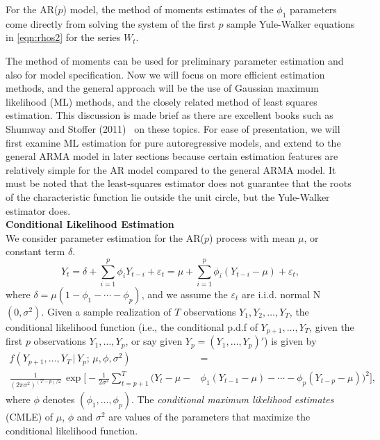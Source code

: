 \begin{ex}[AR($p$) Model]
 For the AR($p$) model, the method of moments estimates of the $\phi_1$ parameters come directly from solving the system of the first $p$ sample Yule-Walker equations in \eqref{eqn:rhos2} for the series $W_t$. \xqed
\end{ex}


The method of moments can be used for preliminary parameter estimation and also for model specification. Now we will focus on more efficient estimation methods, and the general approach will be the use of Gaussian maximum likelihood (ML) methods, and the closely related method of least squares estimation. This discussion is made brief as there are excellent books such as Shumway and Stoffer (2011)~\cite{shumway2011arima} on these topics. For ease of presentation, we will first examine ML estimation for pure autoregressive models, and extend to the general ARMA model in later sections because certain estimation features are relatively simple for the AR model compared to the general ARMA model. It must be noted that the least-squares estimator does not guarantee that the roots of the characteristic function lie outside the unit circle, but the Yule-Walker estimator does. \\


\noindent\textbf{Conditional Likelihood Estimation} \\


We consider parameter estimation for the AR($p$) process with mean $\mu$, or constant term $\delta$.
	\begin{equation} \label{eqn:ytseqagain}
	Y_t = \delta + \sum_{i=1}^p \phi_i Y_{t-i} + \varepsilon_t= \mu + \sum_{i=1}^p \phi_i (Y_{t-i} - \mu) + \varepsilon_t,
	\end{equation}
where $\delta = \mu(1 - \phi_1 - \cdots - \phi_p)$, and we assume the $\varepsilon_t$ are i.i.d. normal N$(0, \sigma^2)$. Given a sample realization of $T$ observations $Y_1, Y_2, \ldots, Y_T$, the conditional likelihood function (i.e., the conditional p.d.f of $Y_{p+1}, \ldots, Y_T$, given the first $p$ observations $Y_1, \ldots, Y_p$, or say given $Y_p = (Y_1, \ldots, Y_p)'$) is given by
	\[
	\begin{split}
	f(Y_{p+1}, \ldots,Y_T \,|\, Y_p;\, \mu, \phi, \sigma^2)&= \\ 
	\frac{1}{(2\pi\sigma^2)^{(T-p)/2}}\, \exp\bigg[-\frac{1}{2\sigma^2}\sum_{t=p+1}^T \big(Y_t - \mu - &\phi_1(Y_{t-1} - \mu) - \cdots  - \phi_p(Y_{t-p} - \mu) \big)^2 \bigg],
	\end{split}
	\]
where $\phi$ denotes $(\phi_1,\ldots,\phi_p)$. The \emph{conditional maximum likelihood estimates} (CMLE) of $\mu$, $\phi$ and $\sigma^2$ are values of the parameters that maximize the conditional likelihood function.


